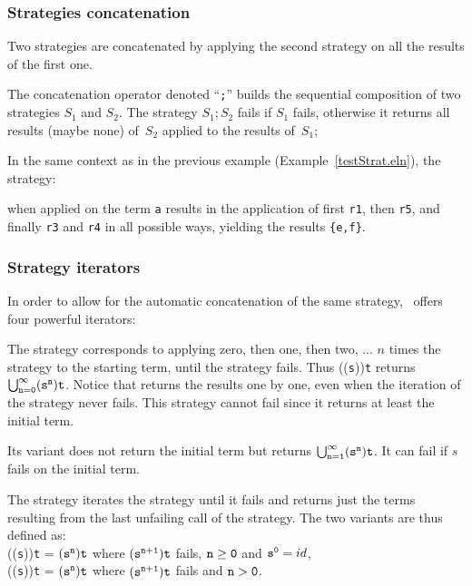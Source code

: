 \subsubsection{Strategies concatenation}

Two strategies are concatenated by applying the second strategy on
all the results of the first one.

The concatenation operator denoted ``\texttt{;}'' builds the sequential 
composition of two strategies $S_1$ and $S_2$. The strategy 
$S_1 ; S_2$ fails if $S_1$ fails, otherwise it returns all results
(maybe none) of~$S_2$ applied to the results of~$S_1$;


\EX In the same context as in the previous example
(Example~\ref{testStrat.eln}), the strategy:

\noindent 
when applied on the term {\tt a} results in the application of first
{\tt r1}, then {\tt r5}, and finally  {\tt r3} and {\tt r4}
in all possible ways, yielding the results {\tt \{e,f\}}.
\FEX

\subsubsection{Strategy iterators}

In order to allow for the automatic concatenation of the same strategy,
\elan\ offers four powerful iterators:

The strategy  corresponds to applying zero, then one, then
two, ... $n$  times the strategy to the starting term, until the strategy
fails. Thus (({\tt s})){\tt t} returns $\tt \bigcup_{n =
0}^{\infty} (s^{n})t$. Notice that  returns the results
one by one, even when the iteration of the strategy never fails.
This strategy cannot fail since it returns at least the initial term.

Its variant  does not return the initial term but returns
$\tt \bigcup_{n = 1}^{\infty} (s^{n})t$. It can fail if $s$ fails 
on the initial term.

The strategy  iterates the strategy until it fails and
returns just the terms resulting from the last unfailing call of the
strategy. The two variants are thus defined as:\\
(({\tt s})){\tt t} = $\tt (s^n)t$ where $\tt (s^{n+1})t$
fails, $\tt n \geq 0$ and ${\tt s^0} = id$,\\
(({\tt s})){\tt t} = $\tt (s^n)t$ where $\tt (s^{n+1})t$
fails and $\tt n > 0$.


